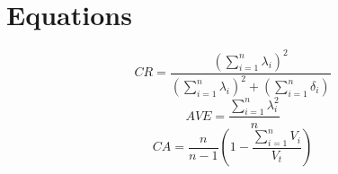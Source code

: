 \section{Equations}
\begin{equation}
\label{eq:CR}
CR = \frac{(\sum_{i=1}^n \lambda_i)^2}{(\sum_{i=1}^n \lambda_i)^2+(\sum_{i=1}^n \delta_i)} 
\end{equation}
\begin{equation}
\label{eq:AVE}
AVE = \frac{\sum_{i=1}^n \lambda_i^2}{n}
\end{equation}
\begin{equation}
\label{eq:CA}
CA = \frac{n}{n-1}(1-\frac{\sum_{i=1}^n V_i}{V_t}) 
\end{equation}

